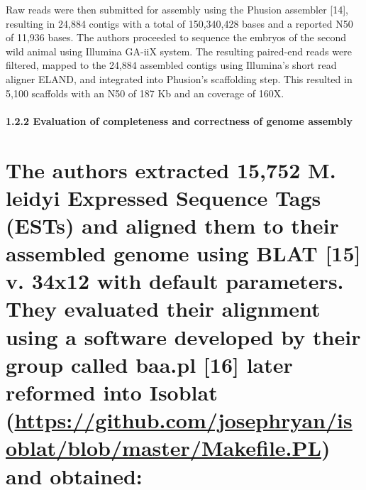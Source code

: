 \documentclass[
]{article}
\begin{document}
Raw reads were then submitted for assembly using the Phusion assembler
{[}14{]}, resulting in 24,884 contigs with a total of 150,340,428 bases
and a reported N50 of 11,936 bases. The authors proceeded to sequence
the embryos of the second wild animal using Illumina GA-iiX system. The
resulting paired-end reads were filtered, mapped to the 24,884 assembled
contigs using Illumina's short read aligner ELAND, and integrated into
Phusion's scaffolding step. This resulted in 5,100 scaffolds with an N50
of 187 Kb and an coverage of 160X.

\hypertarget{evaluation-of-completeness-and-correctness-of-genome-assembly}{%
\paragraph{1.2.2 Evaluation of completeness and correctness of genome
assembly}\label{evaluation-of-completeness-and-correctness-of-genome-assembly}}

\hypertarget{the-authors-extracted-15752-m.-leidyi-expressed-sequence-tags-ests-and-aligned-them-to-their-assembled-genome-using-blat-15-v.-34x12-with-default-parameters.-they-evaluated-their-alignment-using-a-software-developed-by-their-group-called-baa.pl-16-later-reformed-into-isoblat-httpsgithub.comjosephryanisoblatblobmastermakefile.pl-and-obtained}{%
\section{\texorpdfstring{The authors extracted 15,752 M. leidyi
Expressed Sequence Tags (ESTs) and aligned them to their assembled
genome using BLAT {[}15{]} v. 34x12 with default parameters. They
evaluated their alignment using a software developed by their group
called baa.pl {[}16{]} later reformed into Isoblat
(\url{https://github.com/josephryan/isoblat/blob/master/Makefile.PL})
and
obtained:}{The authors extracted 15,752 M. leidyi Expressed Sequence Tags (ESTs) and aligned them to their assembled genome using BLAT {[}15{]} v. 34x12 with default parameters. They evaluated their alignment using a software developed by their group called baa.pl {[}16{]} later reformed into Isoblat (https://github.com/josephryan/isoblat/blob/master/Makefile.PL) and obtained:}}\label{the-authors-extracted-15752-m.-leidyi-expressed-sequence-tags-ests-and-aligned-them-to-their-assembled-genome-using-blat-15-v.-34x12-with-default-parameters.-they-evaluated-their-alignment-using-a-software-developed-by-their-group-called-baa.pl-16-later-reformed-into-isoblat-httpsgithub.comjosephryanisoblatblobmastermakefile.pl-and-obtained}}
\end{document}
